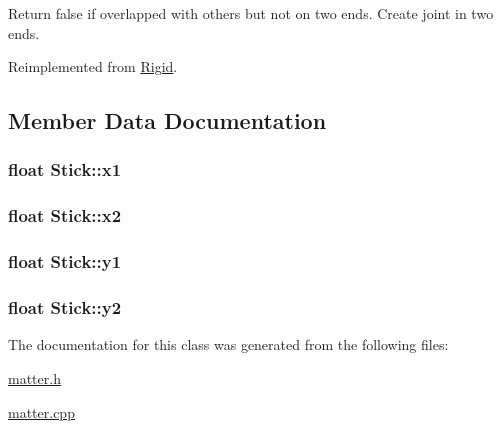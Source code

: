 Return false if overlapped with others but not on two ends. Create joint in two ends. 



Reimplemented from \hyperlink{classRigid_ab9f52207acc82810d4aecdbef59d25fc}{Rigid}.



\subsection{Member Data Documentation}
\hypertarget{classStick_a64598c448a15601cca5da6f1746db6bd}{}
\subsubsection[{x1}]{\setlength{\rightskip}{0pt plus 5cm}float Stick\+::x1\hspace{0.3cm}{\ttfamily [protected]}}\label{classStick_a64598c448a15601cca5da6f1746db6bd}
\hypertarget{classStick_aa0c2a77310a9cbb517cfe62545bb77f4}{}
\subsubsection[{x2}]{\setlength{\rightskip}{0pt plus 5cm}float Stick\+::x2\hspace{0.3cm}{\ttfamily [protected]}}\label{classStick_aa0c2a77310a9cbb517cfe62545bb77f4}
\hypertarget{classStick_aa90dd67e8ce5ea1ea2106ad46c05b012}{}
\subsubsection[{y1}]{\setlength{\rightskip}{0pt plus 5cm}float Stick\+::y1\hspace{0.3cm}{\ttfamily [protected]}}\label{classStick_aa90dd67e8ce5ea1ea2106ad46c05b012}
\hypertarget{classStick_a1cae5d5fbddeb3ef7a653376da1dd2c6}{}
\subsubsection[{y2}]{\setlength{\rightskip}{0pt plus 5cm}float Stick\+::y2\hspace{0.3cm}{\ttfamily [protected]}}\label{classStick_a1cae5d5fbddeb3ef7a653376da1dd2c6}


The documentation for this class was generated from the following files\+:\begin{DoxyCompactItemize}
\item 
\hyperlink{matter_8h}{matter.\+h}\item 
\hyperlink{matter_8cpp}{matter.\+cpp}\end{DoxyCompactItemize}
